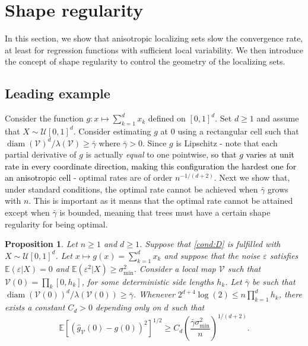 \documentclass[paper=a4, fontsize=11pt]{scrartcl}
\newcommand{\diam}{\operatorname{diam}}
\newcommand{\EE}{\mathbb{E}}
\newtheorem{proposition}[theorem]{Proposition}
\newcommand{\rev}[1]{\textcolor{black}{#1}}
\begin{document}
\section{Shape regularity}\label{sectionSR}

In this section, we show that anisotropic localizing sets slow the convergence rate, at least for regression functions with sufficient local variability. We then introduce the concept of shape regularity to control the geometry of the localizing sets.


\subsection{Leading example}\label{leading_ex}
 Consider the function $g:x\mapsto \sum_{k=1} ^d x_k $ defined on $[0,1]^d$. Set $d\geq 1$ and assume that $X \sim \mathcal U [0,1]^d$. Consider estimating $g$ at $0$ using a rectangular cell such that $\diam(\mathcal V)^d/ \lambda (\mathcal V) \geq \bar {\gamma}$ where $\bar {\gamma} >0$. Since $g$ is Lipschitz - note that each partial derivative of $g$ is actually \textit{equal} to one pointwise, \rev{so that $g$ varies at unit rate in every coordinate direction, making this configuration the hardest one for an anisotropic cell} - optimal rates are of order $ n^{ - 1/(d+2)}$. Next we show that, under standard conditions, the optimal rate cannot be achieved when $\bar \gamma $ grows with $n$. This is important as it means that the optimal rate cannot be attained except when $\bar{\gamma}$ is bounded, meaning that trees must have a certain shape regularity for being optimal. 


\begin{proposition}\label{contre_ex}
Let $n\geq 1$ and $d\geq 1$. Suppose that \ref{cond:D} is fulfilled with $X \sim \mathcal U [0,1]^d$. Let $x \mapsto g(x) = \sum_{k=1} ^d x_k$ and suppose that the noise $\varepsilon$ satisfies $\EE(\varepsilon|X)=0$ and $\EE(\varepsilon^2 | X) \geq \sigma^2_{\text{min}}$.  Consider a local map $\mathcal V$ such that $ \mathcal V(0) = \prod_k[0,h_k]$, for some deterministic side lengths $h_k$. Let $\bar{\gamma}$ be such that $\diam(\mathcal V(0))^d/ \lambda (\mathcal V(0)) \geq \bar{\gamma}$. Whenever $2^{d+4} \log(2) \leq  n \prod_{k=1}^d h_k$, there exists a constant $C_d > 0$ depending only on $d$ such that $$   \EE [ ( \hat g_{\mathcal V} (0 ) -  g(0 ))^2 ]^{1/2}  \geq  C_d \left( \dfrac{\bar{\gamma} \sigma^2_{\text{min}}}{n} \right)^{1/(d+2)}. $$
\end{proposition}
\end{document}
